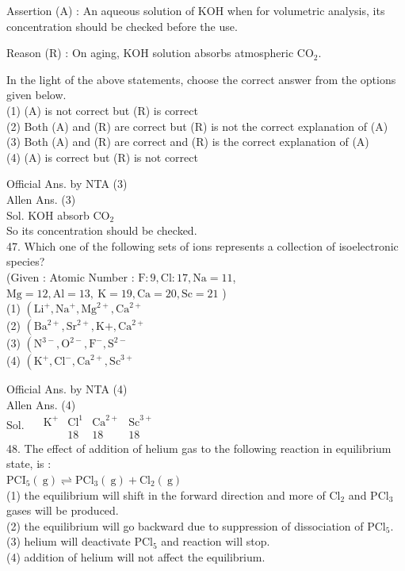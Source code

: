 \documentclass[10pt]{article}
\begin{document}
Assertion (A) : An aqueous solution of KOH when for volumetric analysis, its concentration should be checked before the use.

Reason (R) : On aging, KOH solution absorbs atmospheric \(\mathrm{CO}_{2}\).

In the light of the above statements, choose the correct answer from the options given below.\\
(1) (A) is not correct but (R) is correct\\
(2) Both (A) and (R) are correct but (R) is not the correct explanation of (A)\\
(3) Both (A) and (R) are correct and (R) is the correct explanation of (A)\\
(4) (A) is correct but (R) is not correct

Official Ans. by NTA (3)\\
Allen Ans. (3)\\
Sol. KOH absorb \(\mathrm{CO}_{2}\)\\
So its concentration should be checked.\\
47. Which one of the following sets of ions represents a collection of isoelectronic species?\\
(Given : Atomic Number : \(\mathrm{F}: 9, \mathrm{Cl}: 17, \mathrm{Na}=11\),\\
\(\mathrm{Mg}=12, \mathrm{Al}=13, \mathrm{~K}=19, \mathrm{Ca}=20, \mathrm{Sc}=21\) )\\
(1) \(\left(\mathrm{Li}^{+}, \mathrm{Na}^{+}, \mathrm{Mg}^{2+}, \mathrm{Ca}^{2+}\right.\)\\
(2) \(\left(\mathrm{Ba}^{2+}, \mathrm{Sr}^{2+}, \mathrm{K}+, \mathrm{Ca}^{2+}\right.\)\\
(3) \(\left(\mathrm{N}^{3-}, \mathrm{O}^{2-}, \mathrm{F}^{-}, \mathrm{S}^{2-}\right.\)\\
(4) \(\left(\mathrm{K}^{+}, \mathrm{Cl}^{-}, \mathrm{Ca}^{2+}, \mathrm{Sc}^{3+}\right.\)

Official Ans. by NTA (4)\\
Allen Ans. (4)\\
Sol. \(\quad \begin{array}{cccc}\mathrm{K}^{+} & \mathrm{Cl}^{1} & \mathrm{Ca}^{2+} & \mathrm{Sc}^{3+} \\ & 18 & 18 & 18\end{array}\)\\
48. The effect of addition of helium gas to the following reaction in equilibrium state, is :\\
\(\mathrm{PCI}_{5}(\mathrm{~g}) \rightleftharpoons \mathrm{PCl}_{3}(\mathrm{~g})+\mathrm{Cl}_{2}(\mathrm{~g})\)\\
(1) the equilibrium will shift in the forward direction and more of \(\mathrm{Cl}_{2}\) and \(\mathrm{PCl}_{3}\) gases will be produced.\\
(2) the equilibrium will go backward due to suppression of dissociation of \(\mathrm{PCl}_{5}\).\\
(3) helium will deactivate \(\mathrm{PCl}_{5}\) and reaction will stop.\\
(4) addition of helium will not affect the equilibrium.
\end{document}
